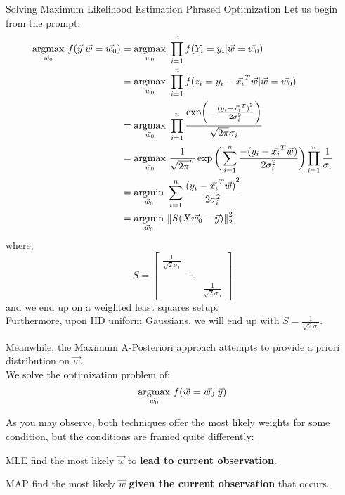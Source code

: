 \begin{ln-explain}{Solving Maximum Likelihood Estimation Phrased Optimization}{}
    Let us begin from the prompt:
    \begin{align*}
        \underset{\vec{w}_0}{\rm argmax}\ f (\vec{y} | \vec{w} = \vec{w_0})
        &= \underset{\vec{w}_0}{\rm argmax}\ \prod_{i = 1}^n f(Y_i = y_i | \vec{w} = \vec{w_0}) \\
        &= \underset{\vec{w}_0}{\rm argmax}\ \prod_{i = 1}^n f(z_i = y_i - \vec{x_i}^T \vec{w} | \vec{w} = \vec{w_0}) \\
        &= \underset{\vec{w}_0}{\rm argmax}\ \prod_{i = 1}^n \frac{\exp(-\frac{{(y_i - \vec{x_i}^T)}^2}{2\sigma_i^2})}{\sqrt{2 \pi} \sigma_i} \\
        &= \underset{\vec{w}_0}{\rm argmax}\ \frac{1}{{\sqrt{2\pi}}^n} \exp \bigg( \sum_{i = 1}^n \frac{-(y_i - \vec{x_i}^T \vec{w})}{2 \sigma_i^2} \bigg) \prod_{i = 1}^n \frac{1}{\sigma_i} \\
        &= \underset{\vec{w}_0}{\rm argmin}\ \sum_{i = 1}^n \frac{{(y_i - \vec{x_i}^T \vec{w})}^2}{2 \sigma_i^2} \\
        &= \underset{\vec{w}_0}{\rm argmin}\ \pnorm[2]{S(X \vec{w_0} - \vec{y})}{2}
    \end{align*}
    where,
    \[
        S =
        \begin{bmatrix}
            \frac{1}{\sqrt{2} \sigma_1} & & \\
            & \ddots & \\
            & & \frac{1}{\sqrt{2} \sigma_n}
        \end{bmatrix}
    \]
    and we end up on a weighted least squares setup. \\
    Furthermore, upon IID uniform Gaussians, we will end up with $S = \frac{1}{\sqrt{2} \sigma_i}$.
\end{ln-explain}

Meanwhile, the Maximum A-Posteriori approach attempts to provide a priori distribution on $\vec{w}$. \\
We solve the optimization problem of:
\[
    \underset{\vec{w}_0}{\rm argmax}\ f(\vec{w} = \vec{w_0} | \vec{y})
\]

As you may observe, both techniques offer the most likely weights for some condition, but the conditions are framed quite differently:
\begin{bindenum}
    \item MLE find the most likely $\vec{w}$ to \textbf{lead to current observation}.
    \item MAP find the most likely $\vec{w}$ \textbf{given the current observation} that occurs.
\end{bindenum}

